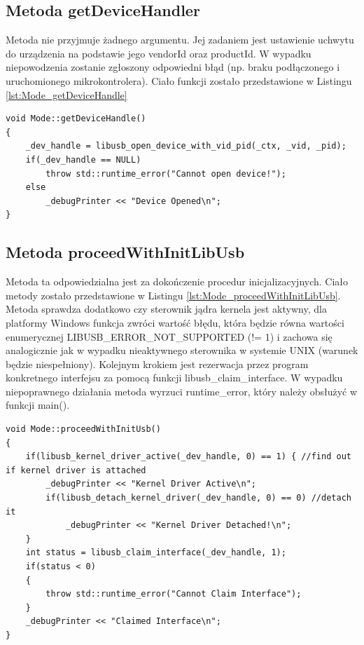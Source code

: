 \documentclass{BscUS}
\begin{document}
\subsection{Metoda getDeviceHandler}
Metoda nie przyjmuje żadnego argumentu. Jej zadaniem jest ustawienie uchwytu do urządzenia na podstawie jego vendorId oraz productId. W wypadku niepowodzenia zostanie zgłoszony odpowiedni błąd (np. braku podłączonego i uruchomionego mikrokontrolera).
Ciało funkcji zostało przedstawione w Listingu \ref{lst:Mode_getDeviceHandle}
\begin{lstlisting}[caption={Metoda Mode::getDeviceHandler()},label={lst:Mode_getDeviceHandle}]
void Mode::getDeviceHandle()
{
	_dev_handle = libusb_open_device_with_vid_pid(_ctx, _vid, _pid);
	if(_dev_handle == NULL)
		throw std::runtime_error("Cannot open device!");
	else
		_debugPrinter << "Device Opened\n";
}
\end{lstlisting}
\subsection{Metoda proceedWithInitLibUsb}
Metoda ta odpowiedzialna jest za dokończenie procedur inicjalizacyjnych. Ciało metody zostało przedstawione w Listingu \ref{lst:Mode_proceedWithInitLibUsb}. Metoda sprawdza dodatkowo czy sterownik jądra kernela jest aktywny, dla platformy Windows funkcja zwróci wartość błędu, która będzie równa wartości enumerycznej LIBUSB\_ERROR\_NOT\_SUPPORTED (!= 1) i zachowa się analogicznie jak w wypadku nieaktywnego sterownika w systemie UNIX (warunek będzie niespełniony).
\newline
Kolejnym krokiem jest rezerwacja przez program konkretnego interfejsu za pomocą funkcji libusb\_claim\_interface.
\newline
W wypadku niepoprawnego działania metoda wyrzuci runtime\_error, który należy obsłużyć  w funkcji main().
\begin{lstlisting}[caption={Metoda Mode::proceedWithInitLibUsb()},label={lst:Mode_proceedWithInitLibUsb}]
void Mode::proceedWithInitUsb()
{
	if(libusb_kernel_driver_active(_dev_handle, 0) == 1) { //find out if kernel driver is attached
		_debugPrinter << "Kernel Driver Active\n";
		if(libusb_detach_kernel_driver(_dev_handle, 0) == 0) //detach it
			_debugPrinter << "Kernel Driver Detached!\n";
	}
	int status = libusb_claim_interface(_dev_handle, 1);
	if(status < 0) 
	{
		throw std::runtime_error("Cannot Claim Interface");
	}
	_debugPrinter << "Claimed Interface\n";
}
\end{lstlisting}
\end{document}
